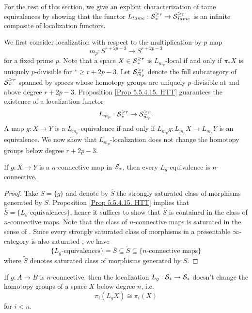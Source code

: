 For the rest of this section, we give an explicit characterization of tame equivalences by showing that the functor $L_{tame}:\operatorname{\mathcal{S}}^{\geq r}_* \to \operatorname{\mathcal{S}}^{\geq r}_{tame}$ is an infinite composite of localization functors.

We first consider localization with respect to the multiplication-by-$p$ map $$
m_p:S^{r+2p-3}\to S^{r+2p-3}$$ for a fixed prime $p$. 
Note that a space $X\in \operatorname{\mathcal{S}}^{\geq r}_*$ is $L_{m_p}$-local if and only if $\pi_{*}X$ is uniquely $p$-divisible for $* \geq r+2p-3$.
Let ${\mathcal{S}}^{\geq r}_{m_p}$ denote the full subcategory of ${\mathcal{S}}^{\geq r}_*$ spanned by spaces whose homotopy groups are uniquely $p$-divisible at and above degree $r+2p-3$.
Proposition \ref{Prop 5.5.4.15. HTT} guarantees the existence of a localization functor
\[
L_{m_p}:\operatorname{\mathcal{S}}^{\geq r}_{*} \to {\mathcal{S}}^{\geq r}_{m_p}.
\]
A map $g:X\to Y$ is a $L_{m_p}$-equivalence if and only if 
$L_{m_p}g: L_{m_p}X \to L_{m_p}Y$ is an equivalence.
We now show that $L_{m_p}$-localization does not change the homotopy groups below degree $r+2p-3$. 
\begin{proposition}
\label{connectivity of local equivalences of spaces}
	If $g: X\to Y$ is a $n$-connective map in $\operatorname{\mathcal{S}}_*$, then every $L_g$-equivalence is $n$-connective.
\end{proposition}
\begin{proof}
	Take $S=\{g\}$ and denote by $\overline{S}$ the strongly saturated class of morphisms generated by $S$. Proposition \ref{Prop 5.5.4.15. HTT} implies that  $\overline{S}= \{L_g\text{-equivalences}\}$, hence it suffices to show that $\overline{S}$ is contained in the class of $n$-connective maps. Note that the class of $n$-connective maps is saturated in the sense of \cite[Definition 5.5.5.1]{HTT}. Since every strongly saturated class of morphisms in a presentable $\infty$-category is also saturated \cite[Example 5.5.5.5.]{HTT}, we have 
	$$
	\{L_g\text{-equivalences}\}=\overline{S} \subseteq \tilde{S} \subseteq \{n\text{-connective maps}\}
	$$
	where $\tilde{S}$ denotes saturated class of morphisms generated by $S$.
\end{proof}

\begin{corollary}
\label{L_g doesn't change lower hpty groups if g is n-conn}
        If $g:A\to B$ is $n$-connective, then  the localization $L_g:{\mathcal{S}}_*\to {\mathcal{S}}_*$ doesn't change the homotopy groups of a space $X$ below degree $n$, i.e. 
	\[
	\pi_{i}(L_gX) \cong \pi_i(X)
	\]
	for $i< n$.
\end{corollary}

